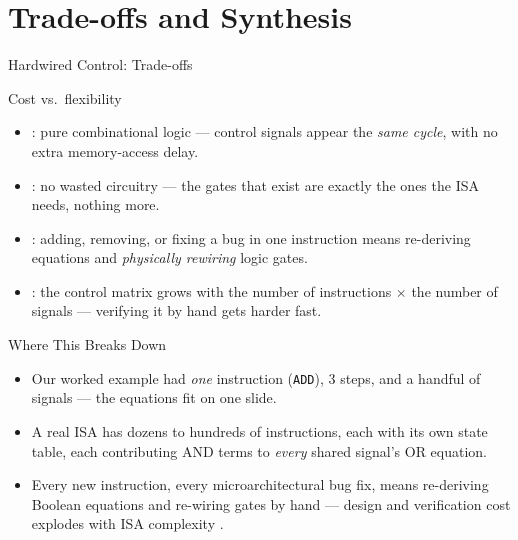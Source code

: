 \documentclass[aspectratio=169]{beamer}
\begin{document}

\section{Trade-offs and Synthesis}

\begin{frame}{Hardwired Control: Trade-offs}
  \begin{block}{Cost vs.\ flexibility}
    \begin{itemize}
      \item {}: pure combinational logic --- control signals appear the
        \emph{same cycle}, with no extra memory-access delay.
      \item {}: no wasted circuitry --- the gates that exist are exactly
        the ones the ISA needs, nothing more.
      \item {}: adding, removing, or fixing a bug in one instruction means
        re-deriving equations and \emph{physically rewiring} logic gates.
      \item {}: the control matrix grows with the number of instructions
        $\times$ the number of signals --- verifying it by hand gets harder fast.
    \end{itemize}
  \end{block}
\end{frame}

\begin{frame}{Where This Breaks Down}
  \begin{itemize}
    \item Our worked example had \emph{one} instruction (\texttt{ADD}), 3 steps,
      and a handful of signals --- the equations fit on one slide.
    \item A real ISA has dozens to hundreds of instructions, each with its own
      state table, each contributing AND terms to \emph{every} shared signal's OR
      equation.
    \item Every new instruction, every microarchitectural bug fix, means
      re-deriving Boolean equations and re-wiring gates by hand --- design and
      verification cost explodes with ISA complexity \cite{Stallings2015_computer_organization}.
  \end{itemize}
\end{frame}
\end{document}
